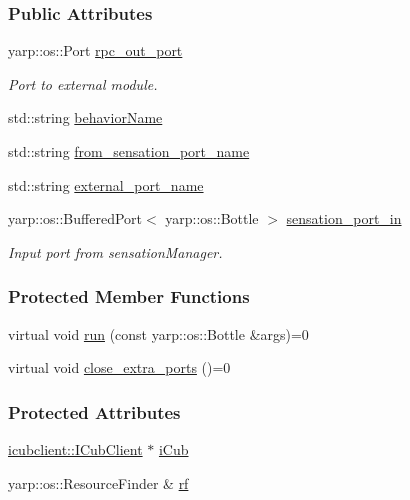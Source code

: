 \subsubsection*{Public Attributes}
\begin{DoxyCompactItemize}
\item 
yarp\+::os\+::\+Port \hyperlink{group__behaviorManager_a69c34f66f1d96b686e3c220822d42a66}{rpc\+\_\+out\+\_\+port}
\begin{DoxyCompactList}\small\item\em Port to external module. \end{DoxyCompactList}\item 
std\+::string \hyperlink{group__behaviorManager_aad9d5bf2f1f1e9c6902a4f40b03c4e67}{behavior\+Name}
\item 
std\+::string \hyperlink{group__behaviorManager_aad1469e84c8de8732b4ebaa7652237a7}{from\+\_\+sensation\+\_\+port\+\_\+name}
\item 
std\+::string \hyperlink{group__behaviorManager_abcacbd31fe67bf4dcded47b2c839128c}{external\+\_\+port\+\_\+name}
\item 
yarp\+::os\+::\+Buffered\+Port$<$ yarp\+::os\+::\+Bottle $>$ \hyperlink{group__behaviorManager_a06324ef0ea01ca50b74f6e3231063482}{sensation\+\_\+port\+\_\+in}
\begin{DoxyCompactList}\small\item\em Input port from sensation\+Manager. \end{DoxyCompactList}\end{DoxyCompactItemize}
\subsubsection*{Protected Member Functions}
\begin{DoxyCompactItemize}
\item 
virtual void \hyperlink{group__behaviorManager_a7dfd81b30f9ddf1864093626650751c3}{run} (const yarp\+::os\+::\+Bottle \&args)=0
\item 
virtual void \hyperlink{group__behaviorManager_affd22d1516cd32ff4f42694a1e6f9ab1}{close\+\_\+extra\+\_\+ports} ()=0
\end{DoxyCompactItemize}
\subsubsection*{Protected Attributes}
\begin{DoxyCompactItemize}
\item 
\hyperlink{group__icubclient__clients_classicubclient_1_1ICubClient}{icubclient\+::\+I\+Cub\+Client} $\ast$ \hyperlink{group__behaviorManager_a5ab3f49bb3a40d79fe2b4aeb76e12196}{i\+Cub}
\item 
yarp\+::os\+::\+Resource\+Finder \& \hyperlink{group__behaviorManager_a789254580a094846e91a9892fa2bc4cd}{rf}
\end{DoxyCompactItemize}



